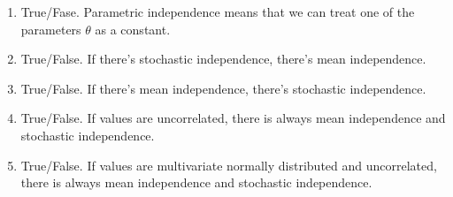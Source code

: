 \documentclass[11pt]{article}
\begin{document}
\begin{enumerate}
\item True/Fase. Parametric independence means that we can treat one of the parameters $\theta$ as a constant. %
\item True/False. If there's stochastic independence, there's mean independence. %
\item True/False. If there's mean independence, there's stochastic independence. %
\item True/False. If values are uncorrelated, there is always mean independence and stochastic independence. %
\item True/False. If values are multivariate normally distributed and uncorrelated, there is always mean independence and stochastic independence. %
\end{enumerate}
\end{document}
